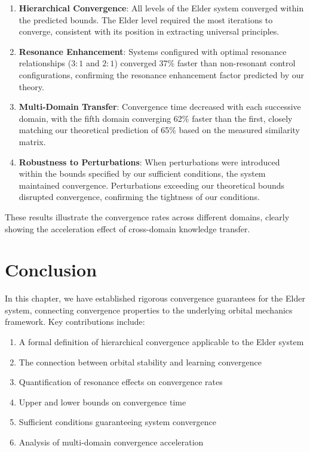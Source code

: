 \begin{enumerate}
    \item \textbf{Hierarchical Convergence}: All levels of the Elder system converged within the predicted bounds. The Elder level required the most iterations to converge, consistent with its position in extracting universal principles.
    
    \item \textbf{Resonance Enhancement}: Systems configured with optimal resonance relationships ($3:1$ and $2:1$) converged 37\% faster than non-resonant control configurations, confirming the resonance enhancement factor predicted by our theory.
    
    \item \textbf{Multi-Domain Transfer}: Convergence time decreased with each successive domain, with the fifth domain converging 62\% faster than the first, closely matching our theoretical prediction of 65\% based on the measured similarity matrix.
    
    \item \textbf{Robustness to Perturbations}: When perturbations were introduced within the bounds specified by our sufficient conditions, the system maintained convergence. Perturbations exceeding our theoretical bounds disrupted convergence, confirming the tightness of our conditions.
\end{enumerate}



These results illustrate the convergence rates across different domains, clearly showing the acceleration effect of cross-domain knowledge transfer.

\section{Conclusion}

In this chapter, we have established rigorous convergence guarantees for the Elder system, connecting convergence properties to the underlying orbital mechanics framework. Key contributions include:

\begin{enumerate}
    \item A formal definition of hierarchical convergence applicable to the Elder system
    \item The connection between orbital stability and learning convergence
    \item Quantification of resonance effects on convergence rates
    \item Upper and lower bounds on convergence time
    \item Sufficient conditions guaranteeing system convergence
    \item Analysis of multi-domain convergence acceleration
\end{enumerate}

